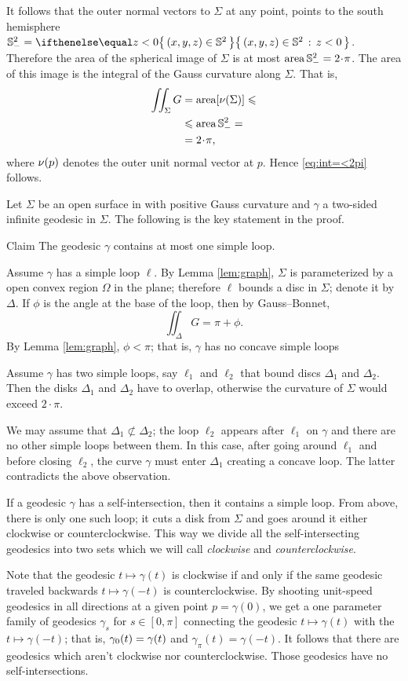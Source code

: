 It follows that the outer normal vectors to $\Sigma$ at any point, points to the south hemisphere $\SS^2_-=\set{(x,y,z)\in\SS^2}{z< 0}$.
Therefore the area of the spherical image of $\Sigma$ is at most $\area\SS^2_-= 2\cdot\pi$.
The area of this image is the integral of the Gauss curvature along $\Sigma$.
That is,
\begin{align*}
\iint_{\Sigma}G&=\area[\Norm(\Sigma)]\le 
\\
&\le \area\SS^2_-=
\\
&=2\cdot\pi,
\end{align*}
where $\nu(p)$ denotes the outer unit normal vector at $p$.
Hence \ref{eq:int=<2pi} follows.
\qeds

Let $\Sigma$ be an open surface in with positive Gauss curvature and $\gamma$ a two-sided infinite geodesic in $\Sigma$.
The following is the key statement in the proof.

\begin{thm}{Claim}
The geodesic $\gamma$ contains at most one simple loop.
\end{thm}

Assume $\gamma$ has a simple loop $\ell$.
By Lemma \ref{lem:graph}, $\Sigma$ is parameterized by a open convex region $\Omega$ in the plane;
therefore $\ell$ bounds a disc in $\Sigma$; denote it by $\Delta$.
If $\phi$ is the angle at the base of the loop, then by Gauss--Bonnet,
\[\iint_\Delta G=\pi+\phi.\] 
By Lemma \ref{lem:graph}, $\phi<\pi$; that is, $\gamma$ has no concave simple loops 

Assume $\gamma$ has two simple loops, say $\ell_1$ and $\ell_2$ that bound discs $\Delta_1$ and $\Delta_2$.
Then the disks $\Delta_1$ and $\Delta_2$ have to overlap,
otherwise the curvature of $\Sigma$ would exceed $2\cdot\pi$.

We may assume that $\Delta_1\not\subset \Delta_2$; the loop $\ell_2$ appears after $\ell_1$ on $\gamma$ and there are no other simple loops between them.
In this case, after going around $\ell_1$ and before closing $\ell_2$, the curve $\gamma$ must enter $\Delta_1$ creating a concave loop.
The latter contradicts the above observation.

If a geodesic $\gamma$ has a self-intersection,
then it contains a simple loop.
From above, there is only one such loop;
it cuts a disk from $\Sigma$ 
and goes around it either clockwise or counterclockwise.
This way we divide all the self-intersecting geodesics 
into two sets which we will call {}\emph{clockwise} and {}\emph{counterclockwise}.

Note that the geodesic $t\mapsto \gamma(t)$ is clockwise 
if and only if the same geodesic traveled backwards
$t\mapsto \gamma(-t)$
is counterclockwise.
By shooting unit-speed geodesics in all directions at a given point $p=\gamma(0)$,
we get a one parameter family of geodesics $\gamma_s$ for $s\in[0,\pi]$ connecting the geodesic $t\mapsto \gamma(t)$ with
the $t\mapsto \gamma(-t)$; that is, $\gamma_0(t)\z=\gamma(t)$ and $\gamma_\pi(t)=\gamma(-t)$. 
It follows that there are geodesics 
which aren't clockwise nor counterclockwise.
Those geodesics have no self-intersections.\qeds
